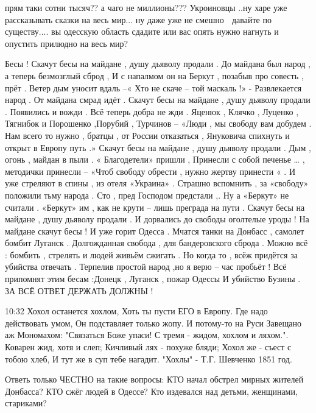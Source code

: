 
прям таки сотни тысяч?? а чаго не миллионы??? Укроиновцы ..ну харе уже
рассказывать сказки на весь мир... ну даже уже не смешно 🙈 давайте по
существу.... вы одесскую область сдадите или вас опять нужно нагнуть и опустить
прилюдно на весь мир?

Бесы ! 
Скачут бесы на майдане , душу дьяволу продали .
До майдана был народ , а теперь безмозглый сброд ,
И с напалмом он на Беркут , позабыв про совесть , прёт .
Ветер дым уносит вдаль –« Хто не скаче – той маскаль !» -
Развлекается народ . От майдана смрад идёт .
Скачут бесы на майдане , душу дьяволу продали .
Появились и вожди . Всё теперь добра не жди .
Яценюк , Клячко , Луценко , Тягнибок и Порошенко ,Порубий , Турчинов –
«Люди , мы свободу вам добудем .
Нам всего то нужно , братцы , от России отказаться ,
 Януковича спихнуть и открыт в Европу путь .»
Скачут бесы на майдане , душу дьяволу продали .
Дым , огонь , майдан в пыли . « Благодетели» пришли ,
Принесли с собой печенье … , методички принесли – 
«Чтоб свободу обрести , нужно жертву принести « .
И уже стреляют в спины , из отеля «Украина» . 
Страшно вспомнить , за «свободу» положили тьму народа .
Сто , пред Господом предстали ,. Ну а «Беркут» не считали .
 «Беркут» им , как не крути – лишь преграда на пути .
Скачут бесы на майдане , душу дьяволу продали .
И дорвались до свободы оголтелые уроды !
На майдане скачут бесы ! И уже горит Одесса .
Мчатся танки на Донбасс , самолет бомбит Луганск .
Долгожданная свобода , для бандеровского сброда .
Можно всё : бомбить , стрелять и людей живьём сжигать .
Но когда то , всёж придётся за убийства отвечать .
Терпелив простой народ ,но я верю – час пробьёт ! 
Всё припомнят этим бесам :Донецк , Луганск , пожар Одессы 
И убийство Бузины . ЗА ВСЁ ОТВЕТ ДЕРЖАТЬ ДОЛЖНЫ !

10:32
Хохол останется хохлом,
Хоть ты пусти ЕГО в Европу.
Где надо действовать умом,
Он подставляет только жопу.
И потому-то на Руси
Завещано аж Мономахом:
"Связаться Боже упаси!
С тремя - жидом, хохлом и ляхом.".
Коварен жид, хотя и слеп;
Кичливый лях - похуже бляди;
Хохол же - съест с тобою хлеб,
И тут же в суп тебе нагадит.
"Хохлы" - Т.Г. Шевченко 1851 год.


Ответь только ЧЕСТНО на такие вопросы: КТО начал обстрел мирных жителей
Донбасса? КТО сжёг людей в Одессе? Кто издевался над детьми, женщинами,
стариками?

